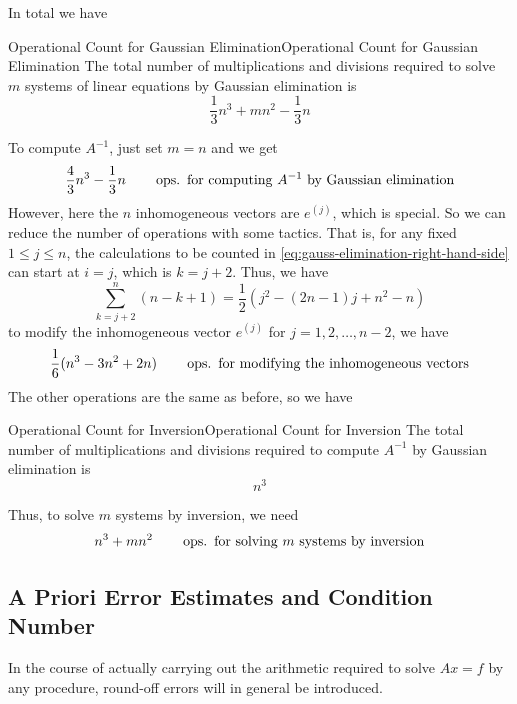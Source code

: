 \documentclass[../main.tex]{subfiles}
\begin{document}
In total we have
\begin{lemma}{Operational Count for Gaussian Elimination}{Operational Count for Gaussian Elimination}
	The total number of multiplications and divisions required to solve $m$ systems of linear equations by Gaussian elimination is
	\begin{equation}
		\frac{1}{3} n^3 + m n^2 - \frac{1}{3}n
	\end{equation}
\end{lemma}

To compute $A^{-1}$, just set $m = n$ and we get
\begin{equation*}
	\frac{4}{3} n^3 - \frac{1}{3} n \qquad \operatorname{ops.} \text{ for computing $A^{-1}$ by Gaussian elimination}
\end{equation*}
However, here the $n$ inhomogeneous vectors are $e^{(j)}$, which is special. So we can reduce the number of operations with some tactics. That is, for any fixed $1 \leq j \leq n$, the calculations to be counted in \eqref{eq:gauss-elimination-right-hand-side} can start at $i = j$, which is $k = j + 2$. Thus, we have
\begin{equation*}
	\sum_{k = j+2}^n (n - k + 1) = \frac{1}{2} (j^2 - (2n - 1) j + n^2 - n)
\end{equation*}
to modify the inhomogeneous vector $e^{(j)}$ for $j = 1, 2, \ldots, n - 2$, we have
\begin{equation*}
	\frac{1}{6}(n^3 - 3 n^2 + 2 n) \qquad \operatorname{ops.} \text{ for modifying the inhomogeneous vectors}
\end{equation*}
The other operations are the same as before, so we have
\begin{lemma}{Operational Count for Inversion}{Operational Count for Inversion}
	The total number of multiplications and divisions required to compute $A^{-1}$ by Gaussian elimination is
	\begin{equation}
		n^3
	\end{equation}
\end{lemma}
Thus, to solve $m$ systems by inversion, we need
\begin{equation*}
	n^3 + m n^2 \qquad \operatorname{ops.} \text{ for solving $m$ systems by inversion}
\end{equation*}

\subsection{A Priori Error Estimates and Condition Number}
In the course of actually carrying out the arithmetic required to solve $A x = f$ by any procedure, round-off errors will in general be introduced.
\end{document}
